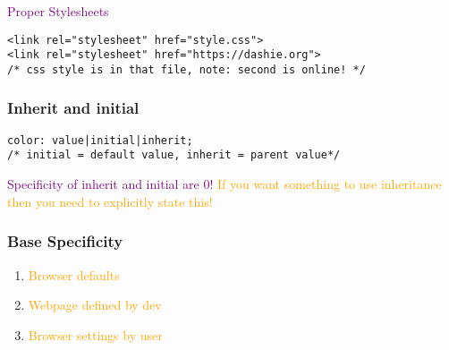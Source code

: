 \documentclass[main.tex,fontsize=6pt,paper=a4,paper=landscape,DIV=calc,]{scrartcl}
\begin{document}
\begin{multicols*}{4}
\textcolor{purple}{Proper Stylesheets}
\vspace{-2mm}
\begin{lstlisting}
<link rel="stylesheet" href="style.css">
<link rel="stylesheet" href="https://dashie.org"> 
/* css style is in that file, note: second is online! */ 
\end{lstlisting}
\vspace{2mm}

\subsubsection{Inherit and initial}
\vspace{-2mm}
\begin{lstlisting}
color: value|initial|inherit;
/* initial = default value, inherit = parent value*/
\end{lstlisting}
\vspace{2mm}
\textcolor{purple}{Specificity of inherit and initial are 0!}\newline
\textcolor{orange}{If you want something to use inheritance then you need to explicitly state this!}

\subsubsection{Base Specificity}
\begin{enumerate}
\item \textcolor{orange}{Browser defaults}
\item \textcolor{orange}{Webpage defined by dev}
\item \textcolor{orange}{Browser settings by user}
\end{enumerate} 


\end{multicols*}
\end{document}
